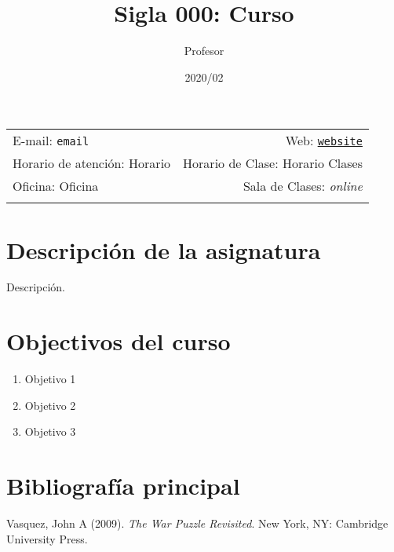 \documentclass[11pt,]{article}
\title{Sigla 000: Curso}
\author{Profesor}
\date{2020/02}
\begin{document}
  

		\maketitle
		
	
		\thispagestyle{firststyle}



	\noindent \begin{tabular*}{\textwidth}{ @{\extracolsep{\fill}} lr @{\extracolsep{\fill}}}


E-mail: \texttt{email} & Web: \href{http://website}{\tt website}\\
Horario de atención: Horario  &  Horario de Clase: Horario Clases\\
Oficina: Oficina  & Sala de Clases: \emph{online}\\
	&  \\
	\hline
	\end{tabular*}
	
\vspace{2mm}
	


\hypertarget{descripciuxf3n-de-la-asignatura}{%
\section{Descripción de la
asignatura}\label{descripciuxf3n-de-la-asignatura}}

Descripción.

\hypertarget{objectivos-del-curso}{%
\section{Objectivos del curso}\label{objectivos-del-curso}}

\begin{enumerate}
\def\labelenumi{\arabic{enumi}.}
\item
  Objetivo 1
\item
  Objetivo 2
\item
  Objetivo 3
\end{enumerate}

\hypertarget{bibliografuxeda-principal}{%
\section{Bibliografía principal}\label{bibliografuxeda-principal}}

Vasquez, John A (2009). \emph{The War Puzzle Revisited}. New York, NY:
Cambridge University Press.
\end{document}
